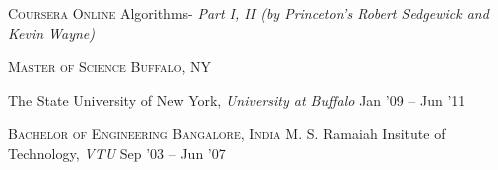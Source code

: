 \documentclass[10pt,a4paper]{article} %
\begin{document}
%

\spacedhrule{1.6em}{-0.4em} %


\headedsection %
{\textsc{Coursera}} {\textsc{Online}} {
  \headedsubsection %
  {Algorithms- \textit{Part I, II (by Princeton's Robert Sedgewick and Kevin Wayne)}}
  {} {
	\\
  }\vspace{-1.0em}
}

\headedsection %
{\textsc{Master of Science}}
{\textsc{Buffalo, NY}} {

  \headedsubsection %
	{The State University of New York, \textit{University at Buffalo}} 
	{Jan '09 -- Jun '11} {}
}


\headedsection %
{\textsc{Bachelor of Engineering}}
{\textsc{Bangalore, India}} {
  \headedsubsection %
  {M. S. Ramaiah Insitute of Technology, \textit{VTU}}
  {Sep '03 -- Jun '07} {}
}
\end{document}
